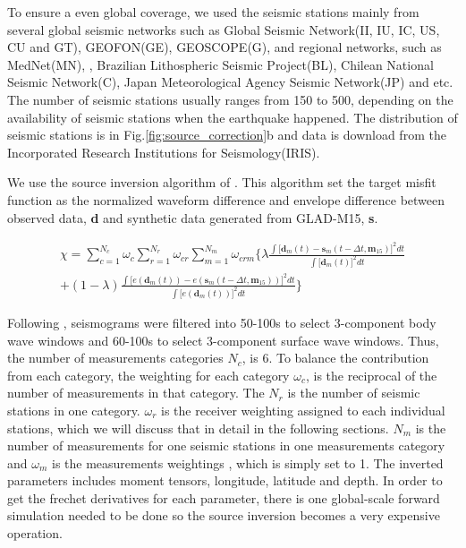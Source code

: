 \documentclass[extra,mreferee]{gji}
\begin{document}
To ensure a even global coverage, we used the seismic stations mainly from several global
seismic networks such as Global Seismic Network(II, IU, IC, US, CU and GT),
GEOFON(GE), GEOSCOPE(G), and regional networks, such as MedNet(MN),
, Brazilian Lithospheric Seismic Project(BL), Chilean National Seismic Network(C), Japan Meteorological
Agency Seismic Network(JP) and etc. The number of seismic stations usually ranges
from 150 to 500, depending on the availability of seismic stations when the earthquake
happened. The distribution of seismic stations is in Fig.\ref{fig:source_correction}b and
data is download from the Incorporated Research Institutions for Seismology(IRIS).

We use the source inversion algorithm of \cite{liu2004spectral}. This algorithm set the
target misfit function as the normalized waveform difference and envelope difference between
observed data, \textbf{d} and synthetic data generated from GLAD-M15, \textbf{s}.

\begin{multline}
  \chi = \sum\limits_{c=1}^{N_c} \omega_c \sum\limits_{r=1}^{N_r} \omega_{cr}
       \sum\limits_{m=1}^{N_m} \omega_{crm}
       \Big\{ \lambda {\frac
              { \int \big[ \mathbf{d}_m(t) - \mathbf{s}_m(t - \Delta t, \mathbf{m}_{15}) \big]^2 dt }
              {\int \big[ \mathbf{d}_m(t) \big]^2  dt } }\\
         + (1 - \lambda) \frac
              {\int \big[ e(\mathbf{d}_m(t)) - e(\mathbf{s}_m(t - \Delta t, \mathbf{m}_{15})) \big]^2 dt }
              {\int \big[ e(\mathbf{d}_m(t)) \big]^2  dt} \Big\}
\end{multline}

Following \cite{ekstrom2012global}, seismograms were filtered into 50-100s
to select 3-component body wave windows and 60-100s to select 3-component
surface wave windows. Thus, the number of measurements categories $N_c$,
is 6. To balance the contribution from each category, the weighting for each
category $\omega_c$, is the reciprocal of the number of measurements in that
category. The $N_r$ is the number of seismic stations in one category. $\omega_r$
is the receiver weighting assigned to each individual stations, which we will discuss
that in detail in the following sections. $N_m$ is the number of measurements for one
seismic stations in one measurements category and $\omega_m$ is the measurements weightings
, which is simply set to 1. The inverted parameters includes moment tensors, longitude,
latitude and depth. In order to get the frechet derivatives for each parameter, there is
one global-scale forward simulation needed to be done so the source inversion becomes a very expensive
operation.
\end{document}
